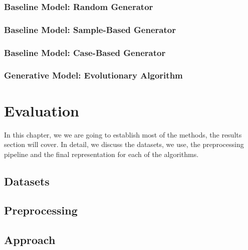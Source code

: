 \documentclass[12pt,a4paper]{report}
\begin{document}
\subsection{Baseline Model: Random Generator}


\subsection{Baseline Model: Sample-Based Generator}


\subsection{Baseline Model: Case-Based Generator}


\subsection{Generative Model: Evolutionary Algorithm}
\label{sec:model_evolutionary}


\chapter{Evaluation}
\label{sec:datasets}
In this chapter, we we are going to establish most of the methods, the results section will cover. In detail, we discuss the datasets, we use, the preprocessing pipeline and the final representation for each of the algorithms.


\section{Datasets}
\label{sec:dataset_description}


\section{Preprocessing}
\label{sec:preprocessing}


\section{Approach}
\label{sec:experimental_setup}

\end{document}
